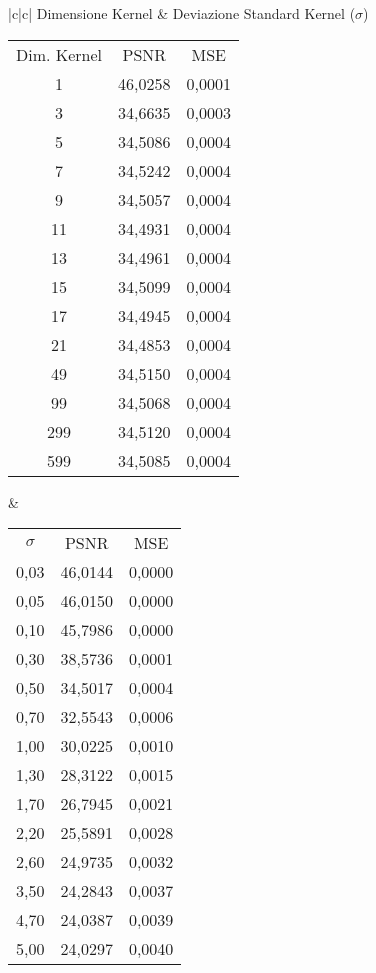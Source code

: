 \documentclass{article}
\begin{document}
\begin{center}
\begin{tabular}{ |c|c|}
\hline
Dimensione Kernel & Deviazione Standard Kernel ($\sigma$) \\
\hline
\begin{tabular}{c|c|c}
Dim. Kernel & PSNR &	MSE \\
1 &	46,0258 &	0,0001 \\
3 &	34,6635 &	0,0003 \\
5 &	34,5086 &	0,0004 \\
7 &	34,5242 &	0,0004 \\
9 &	34,5057 &	0,0004 \\
11 &	34,4931 &	0,0004 \\
13 &	34,4961 &	0,0004 \\
15 &	34,5099 &	0,0004 \\
17 &	34,4945 &	0,0004 \\
21 &	34,4853 &	0,0004 \\
49 &	34,5150 &	0,0004 \\
99 &	34,5068 &	0,0004 \\
299 &	34,5120 &	0,0004 \\
599 &	34,5085 &	0,0004 \\
\hline
\end{tabular} & 
\begin{tabular}{c|c|c}
$\sigma$ &	PSNR &	MSE \\
0,03 &	46,0144 &	0,0000 \\
0,05 &	46,0150 &	0,0000 \\
0,10 &	45,7986 &	0,0000 \\
0,30 &	38,5736 &	0,0001 \\
0,50 &	34,5017 &	0,0004 \\
0,70 &	32,5543 &	0,0006 \\
1,00 &	30,0225 &	0,0010 \\
1,30 &	28,3122 &	0,0015 \\
1,70 &	26,7945 &	0,0021 \\
2,20 &	25,5891 &	0,0028 \\
2,60 &	24,9735 &	0,0032 \\
3,50 &	24,2843 &	0,0037 \\
4,70 &	24,0387 &	0,0039 \\
5,00 &	24,0297 &	0,0040 \\
\hline
\end{tabular}
\end{tabular}
\\
\vspace*{20px}
    

\end{center}
\end{document}
